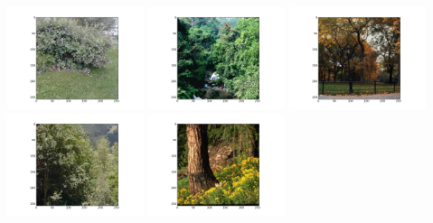 \includegraphics[width=4cm]{dbshow-2-0.png} 
\includegraphics[width=4cm]{dbshow-2-1.png} 
\includegraphics[width=4cm]{dbshow-2-2.png} 
\includegraphics[width=4cm]{dbshow-2-3.png} 
\includegraphics[width=4cm]{dbshow-2-4.png} 

